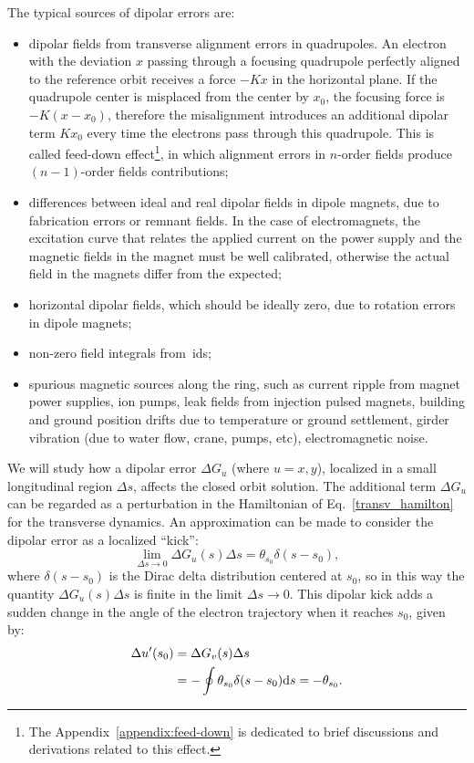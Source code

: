 The typical sources of dipolar errors are:
\begin{itemize}
    \item dipolar fields from transverse alignment errors in quadrupoles. An electron with the deviation $x$ passing through a focusing quadrupole perfectly aligned to the reference orbit receives a force $-Kx$ in the horizontal plane. If the quadrupole center is misplaced from the center by $x_0$, the focusing force is $-K(x - x_0)$, therefore the misalignment introduces an additional dipolar term $K x_0$ every time the electrons pass through this quadrupole. This is called feed-down effect\footnote{The Appendix~\ref{appendix:feed-down} is dedicated to brief discussions and derivations related to this effect.}, in which alignment errors in $n$-order fields produce $(n-1)$-order fields contributions;
    \item differences between ideal and real dipolar fields in dipole magnets, due to fabrication errors or remnant fields. In the case of electromagnets, the excitation curve that relates the applied current on the power supply and the magnetic fields in the magnet must be well calibrated, otherwise the actual field in the magnets differ from the expected;
    \item horizontal dipolar fields, which should be ideally zero, due to rotation errors in dipole magnets;
    \item non-zero field integrals from~\glspl{id};
    \item spurious magnetic sources along the ring, such as current ripple from magnet power supplies, ion pumps, leak fields from injection pulsed magnets, building and ground position drifts due to temperature or ground settlement, girder vibration (due to water flow, crane, pumps, etc), electromagnetic noise.
\end{itemize}
We will study how a dipolar error $\Delta G_u$ (where $u=x, y$), localized in a small longitudinal region $\Delta s$, affects the closed orbit solution. The additional term $\Delta G_u$ can be regarded as a perturbation in the Hamiltonian of Eq.~\eqref{transv_hamilton} for the transverse dynamics. An approximation can be made to consider the dipolar error as a localized ``kick'': 
\begin{equation*}
    \lim_{\Delta s \rightarrow 0}\Delta G_u(s)\Delta s = \theta_{s_0} \delta(s - s_0),
\end{equation*}
where $\delta(s-s_0)$ is the Dirac delta distribution centered at $s_0$, so in this way the quantity $\Delta G_u(s)\Delta s$ is finite in the limit $\Delta s \rightarrow 0$. This dipolar kick adds a sudden change in the angle of the electron trajectory when it reaches $s_0$, given by:
\begin{align*}
    \Delta u'(s_0) &= \Delta G_v(s) \Delta s \\
    &= -\oint \theta_{s_0} \delta(s - s_0) \mathrm{d} s = -\theta_{s_0}.
\end{align*}


